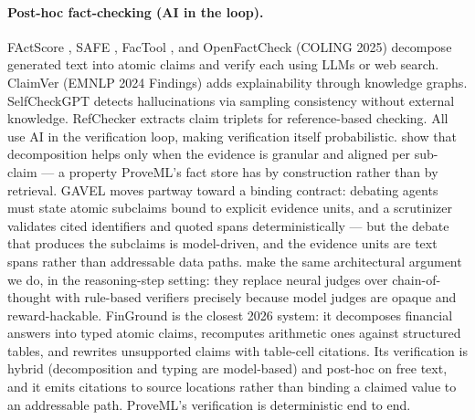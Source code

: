 \documentclass[11pt,a4paper]{article}
\begin{document}
\paragraph{Post-hoc fact-checking (AI in the loop).} FActScore \citep{factscore}, SAFE \citep{safe}, FacTool \citep{factool}, and OpenFactCheck (COLING 2025) decompose generated text into atomic claims and verify each using LLMs or web search. ClaimVer (EMNLP 2024 Findings) adds explainability through knowledge graphs. SelfCheckGPT \citep{selfcheckgpt} detects hallucinations via sampling consistency without external knowledge. RefChecker \citep{refchecker} extracts claim triplets for reference-based checking. All use AI in the verification loop, making verification itself probabilistic. \citet{alignmentbottleneck} show that decomposition helps only when the evidence is granular and aligned per sub-claim --- a property ProveML's fact store has by construction rather than by retrieval. GAVEL \citep{gavel} moves partway toward a binding contract: debating agents must state atomic subclaims bound to explicit evidence units, and a scrutinizer validates cited identifiers and quoted spans deterministically --- but the debate that produces the subclaims is model-driven, and the evidence units are text spans rather than addressable data paths. \citet{verifiableprm} make the same architectural argument we do, in the reasoning-step setting: they replace neural judges over chain-of-thought with rule-based verifiers precisely because model judges are opaque and reward-hackable. FinGround \citep{finground} is the closest 2026 system: it decomposes financial answers into typed atomic claims, recomputes arithmetic ones against structured tables, and rewrites unsupported claims with table-cell citations. Its verification is hybrid (decomposition and typing are model-based) and post-hoc on free text, and it emits citations to source locations rather than binding a claimed value to an addressable path. ProveML's verification is deterministic end to end.
\end{document}
